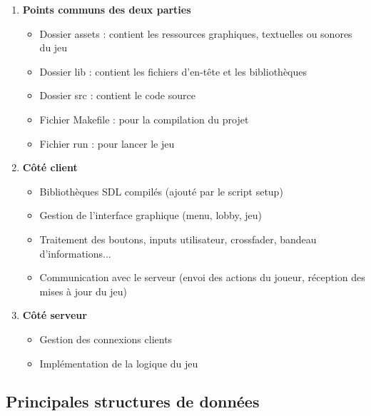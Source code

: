 \documentclass[12pt,a4paper]{article}
\begin{document}
        \begin{enumerate}
            \item \textbf{Points communs des deux parties}
                \begin{itemize}
                    \item Dossier assets : contient les ressources graphiques, textuelles ou sonores du jeu
                    \item Dossier lib : contient les fichiers d’en-tête et les bibliothèques
                    \item Dossier src : contient le code source
                    \item Fichier Makefile : pour la compilation du projet
                    \item Fichier run : pour lancer le jeu
                \end{itemize}
            \item \textbf{Côté client}
                \begin{itemize}
                    \item Bibliothèques SDL compilés (ajouté par le script setup)
                    \item Gestion de l'interface graphique (menu, lobby, jeu) 
                    \item Traitement des boutons, inputs utilisateur, crossfader, bandeau d'informations...
                    \item Communication avec le serveur (envoi des actions du joueur, réception des mises à jour du jeu)
                \end{itemize}
            \item \textbf{Côté serveur}
                \begin{itemize}
                    \item Gestion des connexions clients
                    \item Implémentation de la logique du jeu
                \end{itemize}
        \end{enumerate}

        \subsection{Principales structures de données}
\end{document}
